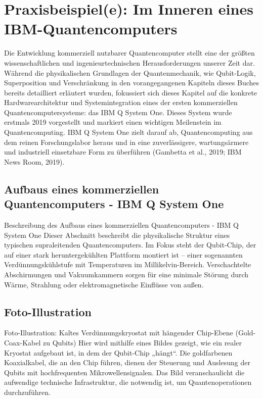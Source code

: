 \section{Praxisbeispiel(e): Im Inneren eines IBM-Quantencomputers}
Die Entwicklung kommerziell nutzbarer Quantencomputer stellt eine der größten wissenschaftlichen und ingenieurtechnischen Herausforderungen unserer Zeit dar. Während die physikalischen Grundlagen der Quantenmechanik, wie Qubit-Logik, Superposition und Verschränkung in den vorangegangenen Kapiteln dieses Buches bereits detailliert erläutert wurden, fokussiert sich dieses Kapitel auf die konkrete Hardwarearchitektur und Systemintegration eines der ersten kommerziellen Quantencomputersysteme: das IBM Q System One. Dieses System wurde erstmals 2019 vorgestellt und markiert einen wichtigen Meilenstein im Quantencomputing. IBM Q System One zielt darauf ab, Quantencomputing aus dem reinen Forschungslabor heraus und in eine zuverlässigere, wartungsärmere und industriell einsetzbare Form zu überführen (Gambetta et al., 2019; IBM News Room, 2019).


\subsection{Aufbaus eines kommerziellen Quantencomputers - IBM Q System One}
Beschreibung des Aufbaus eines kommerziellen Quantencomputers - IBM Q System One
Dieser Abschnitt beschreibt die physikalische Struktur eines typischen supraleitenden Quantencomputers. Im Fokus steht der Qubit-Chip, der auf einer stark heruntergekühlten Plattform montiert ist – einer sogenannten Verdünnungskühlstufe mit Temperaturen im Millikelvin-Bereich. Verschachtelte Abschirmungen und Vakuumkammern sorgen für eine minimale Störung durch Wärme, Strahlung oder elektromagnetische Einflüsse von außen.

\subsection{Foto-Illustration}
Foto-Illustration: Kaltes Verdünnungskryostat mit hängender Chip-Ebene (Gold-Coax-Kabel zu Qubits)
Hier wird mithilfe eines Bildes gezeigt, wie ein realer Kryostat aufgebaut ist, in dem der Qubit-Chip „hängt“. Die goldfarbenen Koaxialkabel, die an den Chip führen, dienen der Steuerung und Auslesung der Qubits mit hochfrequenten Mikrowellensignalen. Das Bild veranschaulicht die aufwendige technische Infrastruktur, die notwendig ist, um Quantenoperationen durchzuführen.

